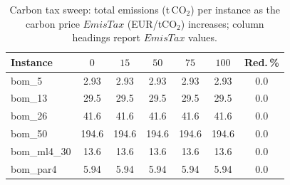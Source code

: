 \begin{table}[!htbp]\centering\scriptsize
\setlength{\tabcolsep}{3pt}
\caption{Carbon tax sweep: total emissions (t\,CO$_2$) per instance as the carbon price $EmisTax$ (EUR/tCO$_2$) increases; column headings report $EmisTax$ values.}\label{tab:tax}
\begin{tabular}{lcccccc}
\toprule
Instance & $0$ & $15$ & $50$ & $75$ & $100$ & Red.\,\%\\
\midrule
bom\_5 & 2.93 & 2.93 & 2.93 & 2.93 & 2.93 & 0.0 \\
bom\_13 & 29.5 & 29.5 & 29.5 & 29.5 & 29.5 & 0.0 \\
bom\_26 & 41.6 & 41.6 & 41.6 & 41.6 & 41.6 & 0.0 \\
bom\_50 & 194.6 & 194.6 & 194.6 & 194.6 & 194.6 & 0.0 \\
bom\_ml4\_30 & 13.6 & 13.6 & 13.6 & 13.6 & 13.6 & 0.0 \\
bom\_par4 & 5.94 & 5.94 & 5.94 & 5.94 & 5.94 & 0.0 \\
\bottomrule
\end{tabular}
\end{table}
